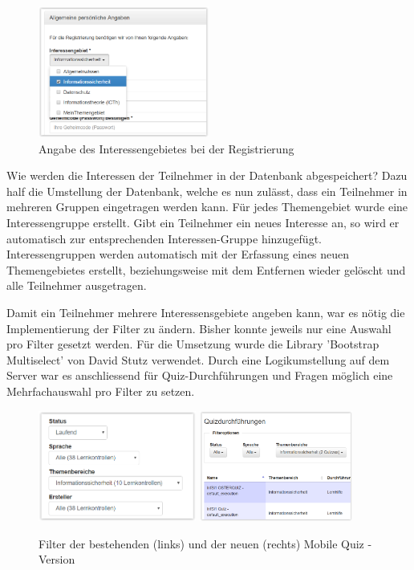 \begin{figure}[H]
	\centering
	\includegraphics[width=0.5\textwidth]{Images/Themengebiet_Angabe_Registrierung.PNG}
	\caption{Angabe des Interessengebietes bei der Registrierung}
\end{figure}

Wie werden die Interessen der Teilnehmer in der Datenbank abgespeichert? Dazu half die Umstellung der Datenbank, welche es nun zulässt, dass ein Teilnehmer in mehreren Gruppen eingetragen werden kann.
Für jedes Themengebiet wurde eine Interessengruppe erstellt. Gibt ein Teilnehmer ein neues Interesse an, so wird er automatisch zur entsprechenden Interessen-Gruppe hinzugefügt. Interessengruppen werden automatisch mit der Erfassung eines neuen Themengebietes erstellt, beziehungsweise mit dem Entfernen wieder gelöscht und alle Teilnehmer ausgetragen.

\bigskip

Damit ein Teilnehmer mehrere Interessensgebiete angeben kann, war es nötig die Implementierung der Filter zu ändern. Bisher konnte jeweils nur eine Auswahl pro Filter gesetzt werden. Für die Umsetzung wurde die Library 'Bootstrap Multiselect' \cite{bootstrap_multiselect} von David Stutz verwendet. Durch eine Logikumstellung auf dem Server war es anschliessend für Quiz-Durchführungen und Fragen möglich eine Mehrfachauswahl pro Filter zu setzen.

\begin{figure}[H]
	\centering
	\includegraphics[width=0.462\textwidth]{Images/Alte_Filter_Mobile_Quiz.PNG}
	\includegraphics[width=0.45\textwidth]{Images/Neue_Filter_Mobile_Quiz.PNG}
	\caption{Filter der bestehenden (links) und der neuen (rechts) Mobile Quiz - Version}
	\cite{mobilequiz.ch}
\end{figure}



